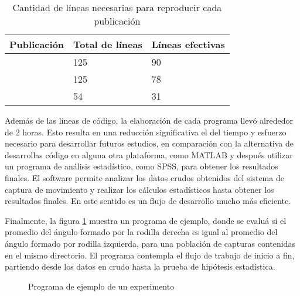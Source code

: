 \begin{table}
    \centering
    \caption{Cantidad de líneas necesarias para reproducir cada publicación}
    \label{tab:eval_lineas}
    \begin{tabular}{lll}
        \toprule
        Publicación & Total de líneas & Líneas efectivas \\
        \midrule
        \cite{mazza} & 125 & 90 \\
        \cite{menz} & 125 & 78 \\
        \cite{mizoguchi} & 54 & 31 \\
        \bottomrule
    \end{tabular}
\end{table}

Además de las líneas de código, la elaboración de cada programa llevó alrededor de 2 horas. Esto resulta en una reducción significativa el del tiempo y esfuerzo necesario para desarrollar futuros estudios, en comparación con la alternativa de desarrollas código en alguna otra plataforma, como MATLAB y después utilizar un programa de análisis estadístico, como SPSS, para obtener los resultados finales. El software permite analizar los datos crudos obtenidos del sistema de captura de movimiento y realizar los cálculos estadísticos hasta obtener los resultados finales. En este sentido es un flujo de desarrollo mucho más eficiente.  

Finalmente, la figura \ref{fig:presentation} muestra un programa de ejemplo, donde se evaluá si el promedio del ángulo formado por la rodilla derecha es igual al promedio del ángulo formado por rodilla izquierda, para una población de capturas contenidas en el mismo directorio. El programa contempla el flujo de trabajo de inicio a fin, partiendo desde los datos en crudo hasta la prueba de hipótesis estadística. 

\begin{figure}
    
    \caption{Programa de ejemplo de un experimento}
    \label{fig:presentation}
\end{figure}






